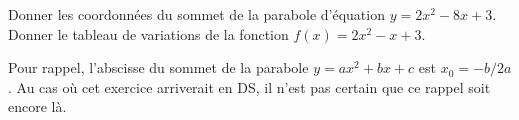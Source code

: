
\begin{exercice}\label{exoPremiere-0073}

    Donner les coordonnées du sommet de la parabole d'équation \( y=2x^2-8x+3\). Donner le tableau de variations de la fonction \( f(x)=2x^2-x+3\).

    Pour rappel, l'abscisse du sommet de la parabole \( y=ax^2+bx+c\) est \(x_0=-b/2a\). {\tiny Au cas où cet exercice arriverait en DS, il n'est pas certain que ce rappel soit encore là.}

\end{exercice}
